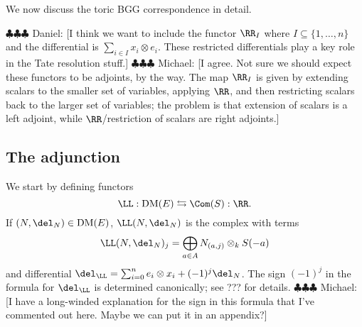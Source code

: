 \documentclass[12pt]{amsart}
\theoremstyle{definition}
\theoremstyle{remark}
\newcommand{\ZZ}{\mathbb Z}
\newcommand{\daniel}[1]{{\color{blue} \sf $\clubsuit\clubsuit\clubsuit$ Daniel: [#1]}}
\newcommand{\michael}[1]{{\color{red} \sf $\clubsuit\clubsuit\clubsuit$ Michael: [#1]}}
\def\DM{\operatorname{DM}}
\begin{document}
We now discuss the toric BGG correspondence in detail.


\daniel{I think we want to include the functor $\RR_I$ where $I\subseteq \{1, \dots, n\}$ and the differential is $\sum_{i\in I} x_i\otimes e_i$.  These restricted differentials play a key role in the Tate resolution stuff.} \michael{I agree. Not sure we should expect these functors to be adjoints, by the way. The map $\RR_I$ is given by extending scalars to the smaller set of variables, applying $\RR$, and then restricting scalars back to the larger set of variables; the problem is that extension of scalars is a left adjoint, while $\RR$/restriction of scalars are right adjoints.}
\subsection{The adjunction}
\iffalse
In the BGG correspondence for the standard $\ZZ$-graded polynomial ring, there are adjoint functors $\RR$ and $\LL$, which give equivalences of categories between $D(S)$ and $D(E)$.  

Famously, under the functor $\RR$,  the standard $\ZZ$-grading of the $S$-modules becomes the homological grading on $D(E)$ side, and the homological grading on $D(S)$ becomes the $\ZZ$-grading of the $E$-modules.  (A similar statement holds for $\LL$.)

Things are more subtle if $S$ has a nonstandard grading, though a similar exchange still holds.  In this section, we will define adjoint functors $\RR$ and $\LL$ which give equivalences of categories between the derived category of $S$-modules and the derived category of differen \daniel{got interrupted while editing\dots}
\fi
We start by defining functors
$$
\LL : \DM(E) \leftrightarrows \Com(S) : \RR.
$$
If $(N, \del_N) \in \DM(E)$, $\LL(N, \del_N)$ is the complex with terms
$$
\LL(N, \del_N)_j = \bigoplus_{a \in A} N_{(a, j)} \otimes_k S(-a)
$$
and differential $\del_{\LL} = \sum_{i = 0}^n e_i \otimes x_i + (-1)^j \del_N$. The sign $(-1)^j$ in the formula for $\del_{\LL}$ is determined canonically; see ??? for details. \michael{I have a long-winded explanation for the sign in this formula that I've commented out here. Maybe we can put it in an appendix?}
\end{document}
